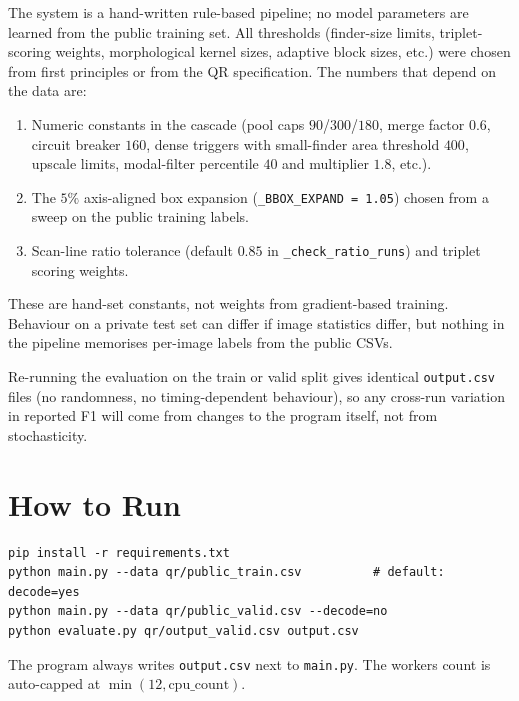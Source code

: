 \documentclass[11pt,a4paper]{article}
\begin{document}
The system is a hand-written rule-based pipeline; no model parameters
are learned from the public training set. All thresholds (finder-size
limits, triplet-scoring weights, morphological kernel sizes, adaptive
block sizes, etc.) were chosen from first principles or from the QR
specification. The numbers that depend on the data are:

\begin{enumerate}[leftmargin=1.4em, itemsep=0.15em]
  \item Numeric constants in the cascade (pool caps $90$/$300$/$180$,
        merge factor $0.6$, circuit breaker $160$, dense triggers with
        small-finder area threshold $400$, upscale limits, modal-filter
        percentile $40$ and multiplier $1.8$, etc.).
  \item The $5\%$ axis-aligned box expansion (\texttt{\_BBOX\_EXPAND =
        1.05}) chosen from a sweep on the public training labels.
  \item Scan-line ratio tolerance (default $0.85$ in
        \texttt{\_check\_ratio\_runs}) and triplet scoring weights.
\end{enumerate}

These are hand-set constants, not weights from gradient-based training.
Behaviour on a private test set can differ if image statistics differ,
but nothing in the pipeline memorises per-image labels from the public CSVs.

Re-running the evaluation on the train or valid split gives
identical \texttt{output.csv} files (no randomness, no
timing-dependent behaviour), so any cross-run variation in reported
F1 will come from changes to the program itself, not from
stochasticity.

\section{How to Run}

\begin{lstlisting}
pip install -r requirements.txt
python main.py --data qr/public_train.csv          # default: decode=yes
python main.py --data qr/public_valid.csv --decode=no
python evaluate.py qr/output_valid.csv output.csv
\end{lstlisting}

The program always writes \texttt{output.csv} next to \texttt{main.py}.
The workers count is auto-capped at $\min(12, \text{cpu\_count})$.
\end{document}

